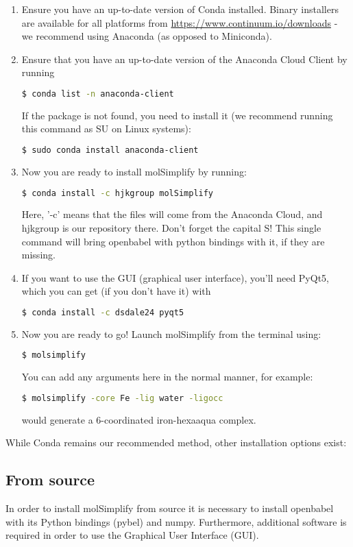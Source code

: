 \begin{enumerate}
\item Ensure you have an up-to-date version of Conda installed. Binary installers are available for all platforms from \url{https://www.continuum.io/downloads} - we recommend using Anaconda (as opposed to Miniconda).
\item Ensure that you have an up-to-date version of the Anaconda Cloud Client by running
\begin{lstlisting}[language=bash]
  $ conda list -n anaconda-client
\end{lstlisting} 
If the package is not found,  you need to install it (we recommend running this command as SU on Linux systems):
\begin{lstlisting}[language=bash]
  $ sudo conda install anaconda-client
\end{lstlisting} 

\item Now you are ready to install molSimplify by running:
\begin{lstlisting}[language=bash]
  $ conda install -c hjkgroup molSimplify
\end{lstlisting} 
Here, '-c' means that the files will come from the Anaconda Cloud, and hjkgroup is our repository there. Don't forget the capital S! This single command will bring openbabel with python bindings with it, if they are missing. 
\item If you want to use the GUI (graphical user interface), you'll need PyQt5, which you can get (if you don't have it) with 
\begin{lstlisting}[language=bash]
  $ conda install -c dsdale24 pyqt5
\end{lstlisting} 
\item Now you are ready to go! Launch molSimplify from the terminal using:
\begin{lstlisting}[language=bash]
  $ molsimplify 
\end{lstlisting} 
You can add any arguments here in the normal manner, for example:
\begin{lstlisting}[language=bash]
  $ molsimplify -core Fe -lig water -ligocc
\end{lstlisting} 
would generate a 6-coordinated iron-hexaaqua complex.
\end{enumerate}


While Conda remains our recommended method, other installation options exist:

\subsection{From source}
In order to install molSimplify from source it is necessary to install openbabel with its Python bindings (pybel) and numpy. Furthermore, additional software is required in order to use the Graphical User Interface (GUI).

